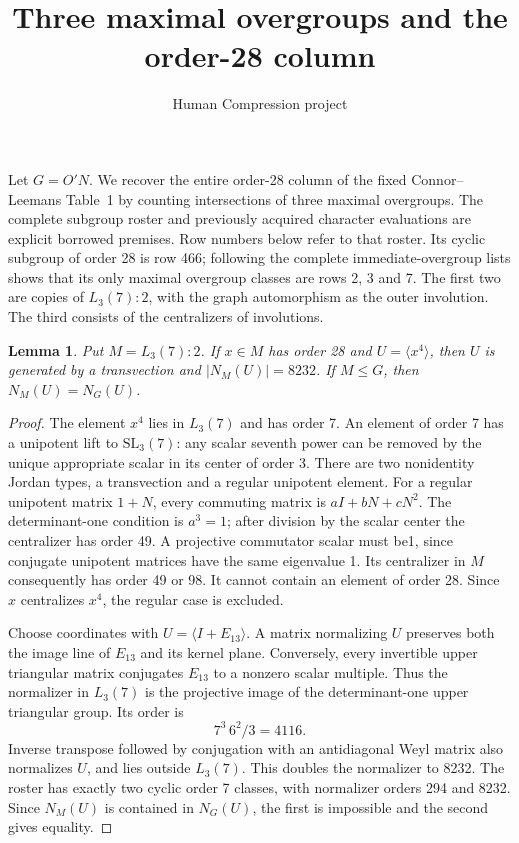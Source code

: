 \documentclass[11pt,a4paper]{article}
\title{Three maximal overgroups and the order-28 column}
\author{Human Compression project}\date{}
\newtheorem{lemma}{Lemma}\newtheorem{theorem}{Theorem}
\begin{document}
\maketitle
Let $G=O'N$. We recover the entire order-28 column of the fixed
Connor--Leemans Table~1 by counting intersections of three maximal
overgroups. The complete subgroup roster and previously acquired
character evaluations are explicit borrowed premises. Row numbers
below refer to that roster. Its cyclic subgroup of order 28 is row 466;
following the complete immediate-overgroup lists shows that its only
maximal overgroup classes are rows 2, 3 and 7. The first two are copies of
$L_3(7):2$, with the graph automorphism as the outer involution. The
third consists of the centralizers of involutions.

\begin{lemma}\label{normalizer}
Put $M=L_3(7):2$. If $x\in M$ has order 28 and $U=\langle x^4\rangle$,
then $U$ is generated by a transvection and $|N_M(U)|=8232$.
If $M\leq G$, then $N_M(U)=N_G(U)$.
\end{lemma}
\begin{proof}
The element $x^4$ lies in $L_3(7)$ and has order 7. An element of order 7
has a unipotent lift to $\mathrm{SL}_3(7)$: any scalar seventh power can
be removed by the unique appropriate scalar in its center of order 3.
There are two nonidentity Jordan types, a transvection and a regular
unipotent element. For a regular unipotent matrix $1+N$, every commuting
matrix is $aI+bN+cN^2$. The determinant-one condition is $a^3=1$;
after division by the scalar center the centralizer has order 49.
A projective commutator scalar must be1, since conjugate unipotent
matrices have the same eigenvalue 1. Its centralizer in $M$ consequently has order 49 or 98. It cannot
contain an element of order 28. Since $x$ centralizes $x^4$, the regular
case is excluded.

Choose coordinates with $U=\langle I+E_{13}\rangle$. A matrix
normalizing $U$ preserves both the image line of $E_{13}$ and its
kernel plane. Conversely, every invertible upper triangular matrix
conjugates $E_{13}$ to a nonzero scalar multiple. Thus the normalizer
in $L_3(7)$ is the projective image of the determinant-one upper
triangular group. Its order is
\[
                         7^3\,6^2/3=4116.
\]
Inverse transpose followed by conjugation with an antidiagonal Weyl
matrix also normalizes $U$, and lies outside $L_3(7)$. This doubles
the normalizer to 8232. The roster has exactly two cyclic order 7
classes, with normalizer orders 294 and 8232. Since $N_M(U)$ is contained
in $N_G(U)$, the first is impossible and the second gives equality.
\end{proof}
\end{document}
